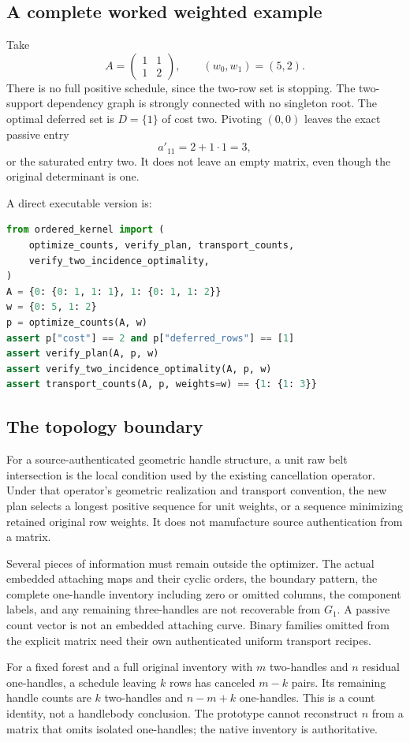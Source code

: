 \documentclass[11pt]{article}
\theoremstyle{definition}\newtheorem{definition}[theorem]{Definition}
\theoremstyle{remark}\newtheorem{remark}[theorem]{Remark}
\begin{document}
\subsection{A complete worked weighted example}
Take
\[
 A=\begin{pmatrix}1&1\\1&2\end{pmatrix},\qquad
 (w_0,w_1)=(5,2).
\]
There is no full positive schedule, since the two-row set is stopping. The two-support dependency graph is strongly connected with no singleton root. The optimal deferred set is $D=\{1\}$ of cost two. Pivoting $(0,0)$ leaves the exact passive entry
\[
 a'_{11}=2+1\cdot1=3,
\]
or the saturated entry two. It does not leave an empty matrix, even though the original determinant is one.

A direct executable version is:
\begin{lstlisting}[language=Python]
from ordered_kernel import (
    optimize_counts, verify_plan, transport_counts,
    verify_two_incidence_optimality,
)
A = {0: {0: 1, 1: 1}, 1: {0: 1, 1: 2}}
w = {0: 5, 1: 2}
p = optimize_counts(A, w)
assert p["cost"] == 2 and p["deferred_rows"] == [1]
assert verify_plan(A, p, w)
assert verify_two_incidence_optimality(A, p, w)
assert transport_counts(A, p, weights=w) == {1: {1: 3}}
\end{lstlisting}

\subsection{The topology boundary}
For a source-authenticated geometric handle structure, a unit raw belt intersection is the local condition used by the existing cancellation operator. Under that operator's geometric realization and transport convention, the new plan selects a longest positive sequence for unit weights, or a sequence minimizing retained original row weights. It does not manufacture source authentication from a matrix.

Several pieces of information must remain outside the optimizer. The actual embedded attaching maps and their cyclic orders, the boundary pattern, the complete one-handle inventory including zero or omitted columns, the component labels, and any remaining three-handles are not recoverable from $G_1$. A passive count vector is not an embedded attaching curve. Binary families omitted from the explicit matrix need their own authenticated uniform transport recipes.

For a fixed forest and a full original inventory with $m$ two-handles and $n$ residual one-handles, a schedule leaving $k$ rows has canceled $m-k$ pairs. Its remaining handle counts are $k$ two-handles and $n-m+k$ one-handles. This is a count identity, not a handlebody conclusion. The prototype cannot reconstruct $n$ from a matrix that omits isolated one-handles; the native inventory is authoritative.
\end{document}
